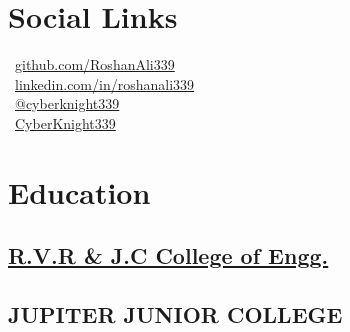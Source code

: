 \documentclass[]{roshan-resume}
\begin{document}
	
	
	
	
	\begin{minipage}[t]{0.33\textwidth} 
		
		
		\section{Social Links} 
		\faGithub \ \href{https://github.com/RoshanAli339}{github.com/RoshanAli339} \\
		\faLinkedinIn \  \href{https://www.linkedin.com/in/roshanali339/}{linkedin.com/in/roshanali339} \\
		\faYoutube \ \href{https://www.youtube.com/@cyberknight339}{@cyberknight339} \\
		\faMediumM \ \href{https://cyberknight339.medium.com}{CyberKnight339}
		\sectionsep
		
		
		\section{Education} 
		
		\subsection{\href{https://rvrjcce.ac.in/}{R.V.R \& J.C College of Engg.}}
		\sectionsep
		
		\subsection{JUPITER JUNIOR COLLEGE}
		\sectionsep
		

\end{minipage}
\end{document}
